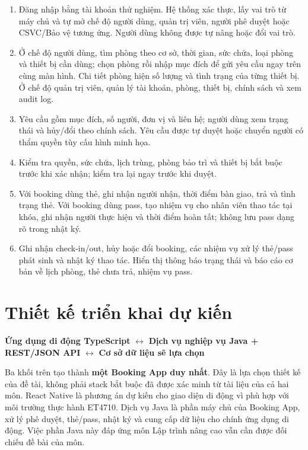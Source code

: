 \documentclass[12pt,a4paper]{article}
\begin{document}
\begin{enumerate}[leftmargin=1.6em,itemsep=2pt,topsep=2pt]
  \item Đăng nhập bằng tài khoản thử nghiệm. Hệ thống xác thực, lấy vai trò từ máy chủ và tự mở chế độ người dùng, quản trị viên, người phê duyệt hoặc CSVC/Bảo vệ tương ứng. Người dùng không được tự nâng hoặc đổi vai trò.
  \item Ở chế độ người dùng, tìm phòng theo cơ sở, thời gian, sức chứa, loại phòng và thiết bị cần dùng; chọn phòng rồi nhập mục đích để gửi yêu cầu ngay trên cùng màn hình. Chi tiết phòng hiện số lượng và tình trạng của từng thiết bị. Ở chế độ quản trị viên, quản lý tài khoản, phòng, thiết bị, chính sách và xem audit log.
  \item Yêu cầu gồm mục đích, số người, đơn vị và liên hệ; người dùng xem trạng thái và hủy/đổi theo chính sách. Yêu cầu được tự duyệt hoặc chuyển người có thẩm quyền tùy cấu hình minh họa.
  \item Kiểm tra quyền, sức chứa, lịch trùng, phòng bảo trì và thiết bị bắt buộc trước khi xác nhận; kiểm tra lại ngay trước khi duyệt.
  \item Với booking dùng thẻ, ghi nhận người nhận, thời điểm bàn giao, trả và tình trạng thẻ. Với booking dùng pass, tạo nhiệm vụ cho nhân viên thao tác tại khóa, ghi nhận người thực hiện và thời điểm hoàn tất; không lưu pass dạng rõ trong nhật ký.
  \item Ghi nhận check-in/out, hủy hoặc đổi booking, các nhiệm vụ xử lý thẻ/pass phát sinh và nhật ký thao tác. Hiển thị thông báo trạng thái và báo cáo cơ bản về lịch phòng, thẻ chưa trả, nhiệm vụ pass.
\end{enumerate}

\section{Thiết kế triển khai dự kiến}

\begin{center}
  \textbf{Ứng dụng di động TypeScript}
  $\longleftrightarrow$
  \textbf{Dịch vụ nghiệp vụ Java + REST/JSON API}
  $\longleftrightarrow$
  \textbf{Cơ sở dữ liệu sẽ lựa chọn}
\end{center}

Ba khối trên tạo thành \textbf{một Booking App duy nhất}. Đây là lựa chọn thiết kế của đề tài, không phải stack bắt buộc đã được xác minh từ tài liệu của cả hai môn. React Native là phương án dự kiến cho giao diện di động vì phù hợp với môi trường thực hành ET4710. Dịch vụ Java là phần máy chủ của Booking App, xử lý phê duyệt, thẻ/pass, nhật ký và cung cấp dữ liệu cho chính ứng dụng di động. Việc phần Java này đáp ứng môn Lập trình nâng cao vẫn cần được đối chiếu đề bài của môn.
\end{document}
